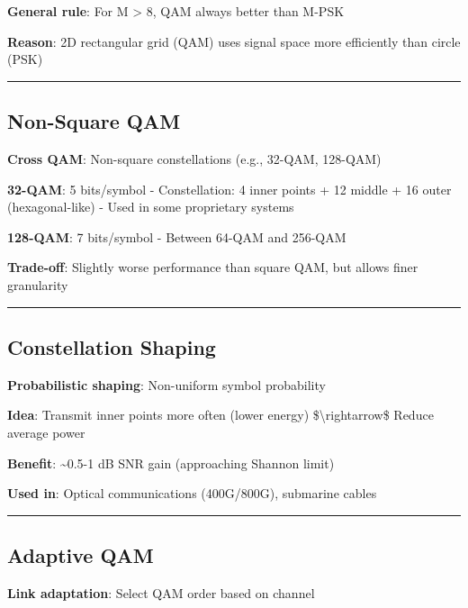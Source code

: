\textbf{General rule}: For M \textgreater{} 8, QAM always better than
M-PSK

\textbf{Reason}: 2D rectangular grid (QAM) uses signal space more
efficiently than circle (PSK)

\begin{center}\rule{0.5\linewidth}{0.5pt}\end{center}

\subsection{Non-Square QAM}\label{non-square-qam}

\textbf{Cross QAM}: Non-square constellations (e.g., 32-QAM, 128-QAM)

\textbf{32-QAM}: 5 bits/symbol - Constellation: 4 inner points + 12
middle + 16 outer (hexagonal-like) - Used in some proprietary systems

\textbf{128-QAM}: 7 bits/symbol - Between 64-QAM and 256-QAM

\textbf{Trade-off}: Slightly worse performance than square QAM, but
allows finer granularity

\begin{center}\rule{0.5\linewidth}{0.5pt}\end{center}

\subsection{Constellation Shaping}\label{constellation-shaping}

\textbf{Probabilistic shaping}: Non-uniform symbol probability

\textbf{Idea}: Transmit inner points more often (lower energy)
\$\textbackslash rightarrow\$ Reduce average power

\textbf{Benefit}: \textasciitilde0.5-1 dB SNR gain (approaching Shannon
limit)

\textbf{Used in}: Optical communications (400G/800G), submarine cables

\begin{center}\rule{0.5\linewidth}{0.5pt}\end{center}

\subsection{Adaptive QAM}\label{adaptive-qam}

\textbf{Link adaptation}: Select QAM order based on channel

